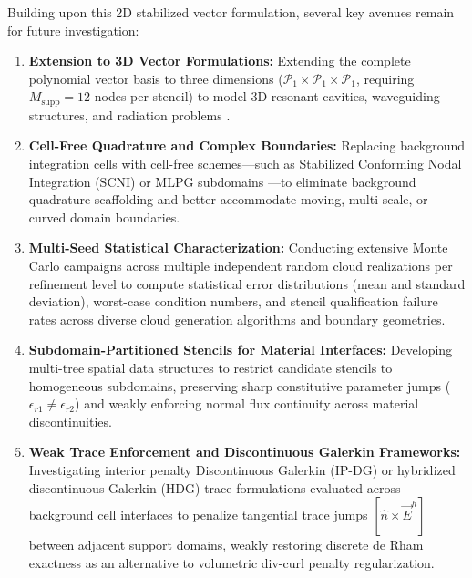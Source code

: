 \documentclass[preprint,12pt]{elsarticle}
\begin{document}
Building upon this 2D stabilized vector formulation, several key avenues remain for future investigation:
\begin{enumerate}
    \item \textbf{Extension to 3D Vector Formulations:}
          Extending the complete polynomial vector basis to three dimensions ($\mathcal{P}_1 \times \mathcal{P}_1 \times \mathcal{P}_1$, requiring $M_{\mathrm{supp}} = 12$ nodes per stencil) to model 3D resonant cavities, waveguiding structures, and radiation problems \cite{goncalves2023vector}.

    \item \textbf{Cell-Free Quadrature and Complex Boundaries:}
          Replacing background integration cells with cell-free schemes---such as Stabilized Conforming Nodal Integration (SCNI) \cite{chen2001stabilized} or MLPG subdomains \cite{atluri2002meshless}---to eliminate background quadrature scaffolding and better accommodate moving, multi-scale, or curved domain boundaries.

    \item \textbf{Multi-Seed Statistical Characterization:}
          Conducting extensive Monte Carlo campaigns across multiple independent random cloud realizations per refinement level to compute statistical error distributions (mean and standard deviation), worst-case condition numbers, and stencil qualification failure rates across diverse cloud generation algorithms and boundary geometries.

    \item \textbf{Subdomain-Partitioned Stencils for Material Interfaces:}
          Developing multi-tree spatial data structures \cite{parreira2006efficient} to restrict candidate stencils to homogeneous subdomains, preserving sharp constitutive parameter jumps ($\epsilon_{r1} \neq \epsilon_{r2}$) and weakly enforcing normal flux continuity across material discontinuities.

    \item \textbf{Weak Trace Enforcement and Discontinuous Galerkin Frameworks:}
          Investigating interior penalty Discontinuous Galerkin (IP-DG) \cite{hesthaven2004high, houston2004mixed} or hybridized discontinuous Galerkin (HDG) trace formulations \cite{nguyen2011hybridizable} evaluated across background cell interfaces to penalize tangential trace jumps $[\hat{n} \times \vec{E}^h]$ between adjacent support domains, weakly restoring discrete de Rham exactness as an alternative to volumetric div-curl penalty regularization.


\end{enumerate}
\end{document}
